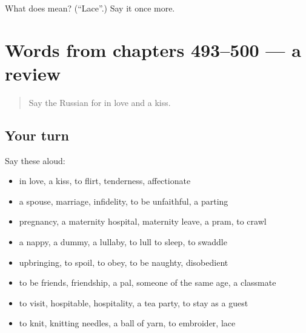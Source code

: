 \begin{tcolorbox}[breakable,colback=teal!4,colframe=teal!35!black,title={Before you move on}]
What does  mean? (\textquotedblleft{}Lace\textquotedblright{}.) Say it once more.
\end{tcolorbox}
\section[(dialogue)]{Words from chapters 493–500 — a review}

\label{lesson:RU-R500-review-493-500}



\begin{quote}
Say the Russian for in love and a kiss.
\end{quote}

\subsection*{Your turn}
Say these aloud:

\begin{itemize}
\raggedright
  \item in love, a kiss, to flirt, tenderness, affectionate
  \item a spouse, marriage, infidelity, to be unfaithful, a parting
  \item pregnancy, a maternity hospital, maternity leave, a pram, to crawl
  \item a nappy, a dummy, a lullaby, to lull to sleep, to swaddle
  \item upbringing, to spoil, to obey, to be naughty, disobedient
  \item to be friends, friendship, a pal, someone of the same age, a classmate
  \item to visit, hospitable, hospitality, a tea party, to stay as a guest
  \item to knit, knitting needles, a ball of yarn, to embroider, lace
\end{itemize}

